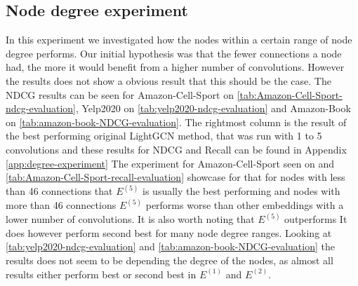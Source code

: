 \subsection{Node degree experiment}
In this experiment we investigated how the nodes within a certain range of node degree performs.
Our initial hypothesis was that the fewer connections a node had, the more it would benefit from a higher number of convolutions.
However the results does not show a obvious result that this should be the case.
The NDCG results can be seen for Amazon-Cell-Sport on \autoref{tab:Amazon-Cell-Sport-ndcg-evaluation}, Yelp2020 on \autoref{tab:yelp2020-ndcg-evaluation} and Amazon-Book on \autoref{tab:amazon-book-NDCG-evaluation}.
The rightmost column is the result of the best performing original LightGCN method, that was run with 1 to 5 convolutions and these results for NDCG and Recall can be found in Appendix \ref{app:degree-experiment}
The experiment for Amazon-Cell-Sport seen on  and \autoref{tab:Amazon-Cell-Sport-recall-evaluation} showcase for that for nodes with less than 46 connections that $E^{(5)}$ is usually the best performing and nodes with more than 46 connections $E^{(5)}$ performs worse than other embeddings with a lower number of convolutions.
It is also worth noting that $E^{(5)}$ outperforms
It does however perform second best for many node degree ranges.
Looking at \autoref{tab:yelp2020-ndcg-evaluation} and \autoref{tab:amazon-book-NDCG-evaluation} the results does not seem to be depending the degree of the nodes, as almost all results either perform best or second best in $E^{(1)}$ and $E^{(2)}$.
